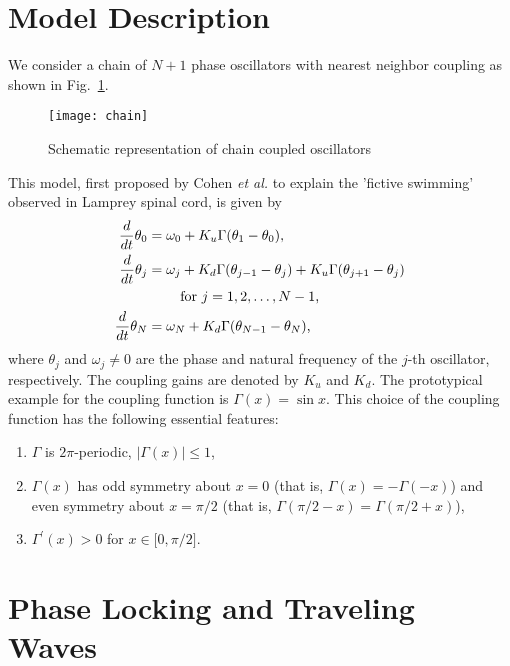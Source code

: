 \documentclass[aps,pre,twocolumn,a4paper,showkeys,showpacs]{revtex4}\usepackage{color}
\theoremstyle{plain}
\theoremstyle{plain}
\begin{document}
\section{Model Description}

\label{sec:mod}We consider a chain of $N+1$ phase oscillators with nearest
neighbor coupling as shown in Fig.~\ref{fig:chaintopology}.\begin{figure}[th]
\texttt{[image: chain]}
\caption{Schematic representation of chain coupled oscillators}\label{fig:chaintopology}\end{figure}This model, first proposed by Cohen \emph{et al.}
\cite{cohen1982ncs} to explain the 'fictive swimming' observed in Lamprey
spinal cord, is given by
\begin{equation}\begin{split}
\frac{d}{dt}\theta_{0}  &  =\omega_{0}+K_{u}\Gamma(\theta_{1}-\theta
_{0})\mbox{,}\\
\frac{d}{dt}\theta_{j}  &  =\omega_{j}+K_{d}\Gamma(\theta_{j-1}-\theta
_{j})+K_{u}\Gamma(\theta_{j+1}-\theta_{j})\\
& \qquad\mbox{\ for \ensuremath{j=1,2,\ldots,N-1},}\\
\frac{d}{dt}\theta_{N}  &  =\omega_{N}+K_{d}\Gamma(\theta_{N-1}-\theta
_{N})\mbox{,}
\end{split}
\label{eq:oscillators}\end{equation}
where $\theta_{j}$ and $\omega_{j}\neq0$ are the phase and natural frequency
of the $j$-th oscillator, respectively. The coupling gains are denoted by
$K_{u}$ and $K_{d}$. The prototypical example for the coupling function is
$\Gamma(x)=\sin x$. This choice of the coupling function has the following
essential features:

\begin{enumerate}
\item $\Gamma$ is $2\pi$-periodic, $\left\vert \Gamma(x)\right\vert \leq1$,

\item $\Gamma(x)$ has odd symmetry about $x=0$ (that is, $\Gamma
(x)=-\Gamma(-x)$) and even symmetry about $x=\pi/2$ (that is, $\Gamma
(\pi/2-x)=\Gamma(\pi/2+x)$),

\item $\Gamma^{\prime}(x)>0$ for $x\in\lbrack0,\pi/2]$.
\end{enumerate}

\section{Phase Locking and Traveling Waves}
\end{document}
